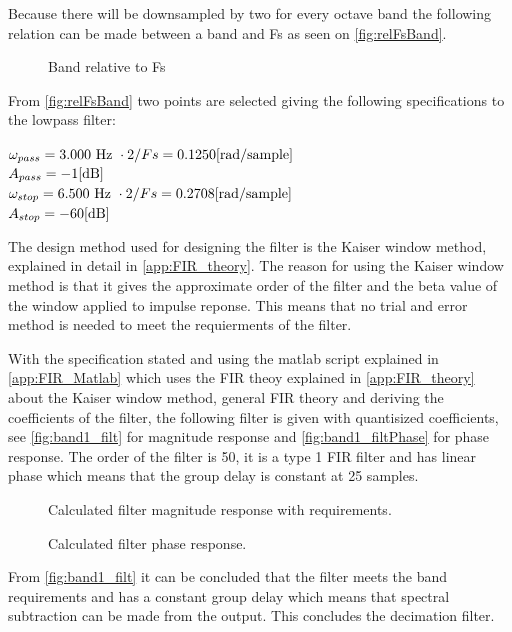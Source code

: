 Because there will be downsampled by two for every octave band the following relation can be made between a band and Fs as seen on \autoref{fig:relFsBand}.
\begin{figure}[H]
	\centering
	
	\caption{Band relative to Fs}
	\label{fig:relFsBand}
\end{figure}

From \autoref{fig:relFsBand} two points are selected giving the following specifications to the lowpass filter:

$\omega_{pass}=3.000\textrm{ Hz }\cdot 2/Fs=0.1250 \enhed{rad/sample}$\\
$A_{pass}=-1 \enhed{dB}$\\
$\omega_{stop}=6.500\textrm{ Hz }\cdot 2/Fs=0.2708 \enhed{rad/sample}$\\
$A_{stop}=-60 \enhed{dB}$

The design method used for designing the filter is the Kaiser window method, explained in detail in \autoref{app:FIR_theory}. The reason for using the Kaiser window method is that it gives the approximate order of the filter and the beta value of the window applied to impulse reponse. This means that no trial and error method is needed to meet the requierments of the filter.

With the specification stated and using the matlab script explained in \autoref{app:FIR_Matlab} which uses the FIR theoy explained in \autoref{app:FIR_theory} about the Kaiser window method, general FIR theory and deriving the coefficients of the filter, the following filter is given with quantisized coefficients, see \autoref{fig:band1_filt} for magnitude response and \autoref{fig:band1_filtPhase} for phase response. The order of the filter is 50, it is a type 1 FIR filter and has linear phase which means that the group delay is constant at 25 samples.  

\begin{figure}[H]
\centering
	
	\caption{Calculated filter magnitude response with requirements.}
	\label{fig:band1_filt}
\end{figure}
\begin{figure}[H]
\centering
	
	\caption{Calculated filter phase response.}
	\label{fig:band1_filtPhase}
\end{figure}

From \autoref{fig:band1_filt} it can be concluded that the filter meets the band requirements and has a constant group delay which means that spectral subtraction can be made from the output. This concludes the decimation filter. 

